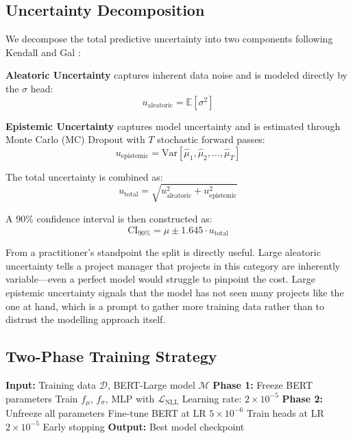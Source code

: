 \documentclass[conference]{IEEEtran}
\begin{document}
\subsection{Uncertainty Decomposition}

We decompose the total predictive uncertainty into two components following Kendall and Gal \cite{kendall2017}:

\textbf{Aleatoric Uncertainty} captures inherent data noise and is modeled directly by the $\sigma$ head:
\begin{equation}
    u_{\text{aleatoric}} = \mathbb{E}[\sigma^2]
\end{equation}

\textbf{Epistemic Uncertainty} captures model uncertainty and is estimated through Monte Carlo (MC) Dropout with $T$ stochastic forward passes:
\begin{equation}
    u_{\text{epistemic}} = \text{Var}[\hat{\mu}_1, \hat{\mu}_2, \ldots, \hat{\mu}_T]
\end{equation}

The total uncertainty is combined as:
\begin{equation}
    u_{\text{total}} = \sqrt{u_{\text{aleatoric}}^2 + u_{\text{epistemic}}^2}
\end{equation}

A 90\% confidence interval is then constructed as:
\begin{equation}
    \text{CI}_{90\%} = \hat{\mu} \pm 1.645 \cdot u_{\text{total}}
\end{equation}

From a practitioner's standpoint the split is directly useful. Large aleatoric uncertainty tells a project manager that projects in this category are inherently variable---even a perfect model would struggle to pinpoint the cost. Large epistemic uncertainty signals that the model has not seen many projects like the one at hand, which is a prompt to gather more training data rather than to distrust the modelling approach itself.

\subsection{Two-Phase Training Strategy}

\begin{algorithm}[t]
\caption{Two-Phase Training with Uncertainty}
\label{alg:training}
\begin{algorithmic}[1]
\STATE \textbf{Input:} Training data $\mathcal{D}$, BERT-Large model $\mathcal{M}$
\STATE \textbf{Phase 1:} Freeze BERT parameters
    \STATE Train $f_\mu$, $f_\sigma$, MLP with $\mathcal{L}_{\text{NLL}}$
    \STATE Learning rate: $2 \times 10^{-5}$
\ENDFOR
\STATE \textbf{Phase 2:} Unfreeze all parameters
    \STATE Fine-tune BERT at LR $5 \times 10^{-6}$
    \STATE Train heads at LR $2 \times 10^{-5}$
        \STATE Early stopping
    \ENDIF
\ENDFOR
\STATE \textbf{Output:} Best model checkpoint
\end{algorithmic}
\end{algorithm}
\end{document}
